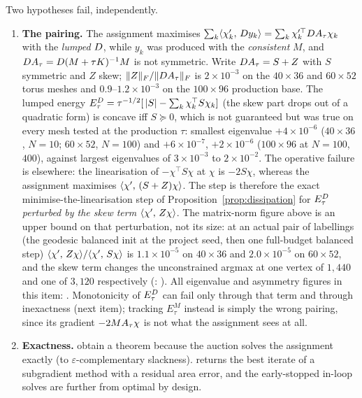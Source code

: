 \documentclass[11pt,a4paper]{article}
\begin{document}
Two hypotheses fail, independently.
\begin{enumerate}[itemsep=1pt]
  \item \textbf{The pairing.} The assignment maximises
    $\sum_k \langle \chi'_k,\, D y_k \rangle = \sum_k \chi_k'^\top DA_\tau \chi_k$ with the
    \emph{lumped} $D$, while $y_k$ was produced with the \emph{consistent}
    $M$, and $DA_\tau = D (M + \tau K)^{-1} M$ is not symmetric. Write
    $DA_\tau = S + Z$ with $S$ symmetric and $Z$ skew;
    $\|Z\|_F / \|DA_\tau\|_F$ is $2 \times 10^{-3}$ on the $40 \times 36$ and
    $60 \times 52$ torus meshes and $0.9$--$1.2 \times 10^{-3}$ on the
    $100 \times 96$ production base. The lumped energy
    $E^{D}_\tau = \tau^{-1/2}[\,|S| - \sum_k \chi_k^\top S \chi_k]$ (the skew part
    drops out of a quadratic form) is concave iff $S \succeq 0$, which is not
    guaranteed but was true on every mesh tested at the production $\tau$:
    smallest eigenvalue $+4 \times 10^{-6}$ ($40 \times 36$, $N = 10$;
    $60 \times 52$, $N = 100$) and $+6 \times 10^{-7}$, $+2 \times 10^{-6}$
    ($100 \times 96$ at $N = 100$, $400$), against largest eigenvalues of
    $3 \times 10^{-3}$ to $2 \times 10^{-2}$. The operative failure is
    elsewhere: the linearisation of $-\chi^\top S \chi$ at $\chi$ is $-2 S\chi$,
    whereas the assignment maximises $\langle \chi',\, (S + Z)\chi \rangle$. The step is
    therefore the exact minimise-the-linearisation step of
    Proposition~\ref{prop:dissipation} for $E^{D}_\tau$ \emph{perturbed by
    the skew term} $\langle \chi',\, Z\chi \rangle$. The matrix-norm figure above is an upper
    bound on that perturbation, not its size: at an actual pair of labellings
    (the geodesic balanced init at the project seed, then one full-budget
    balanced step) $\langle \chi',\, Z\chi \rangle/\langle \chi',\, S\chi \rangle$ is $1.1 \times 10^{-5}$
    on $40 \times 36$ and $2.0 \times 10^{-5}$ on $60 \times 52$, and the skew
    term changes the unconstrained argmax at one vertex of $1{,}440$ and one of
    $3{,}120$ respectively (:
    ). All eigenvalue and asymmetry
    figures in this item: . Monotonicity of
    $E^{D}_\tau$ can fail only through that term and through inexactness
    (next item); tracking $E^M_\tau$ instead is simply the wrong pairing, since
    its gradient $-2 MA_\tau\chi$ is not what the assignment sees at all.
  \item \textbf{Exactness.} \cite{jacobs2018auction} obtain a theorem because
    the auction solves the assignment exactly (to $\varepsilon$-complementary
    slackness).  returns the best iterate of a
    subgradient method with a residual area error, and the early-stopped in-loop
    solves are further from optimal by design.
\end{enumerate}
\end{document}
